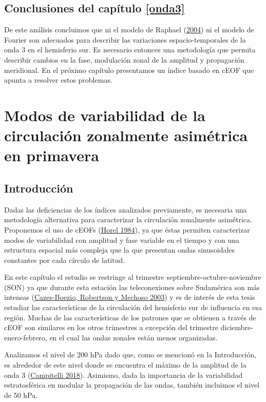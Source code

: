 \documentclass[12pt,oneside,a4paper]{reedthesis}
\begin{document}
\hypertarget{conclusiones-del-capuxedtulo-refonda3}{%
\section{Conclusiones del capítulo \ref{onda3}}\label{conclusiones-del-capuxedtulo-refonda3}}

De este análisis concluimos que ni el modelo de Raphael (\protect\hyperlink{ref-raphael2004}{2004}) ni el modelo de Fourier son adecuados para describir las variaciones espacio-temporales de la onda 3 en el hemisferio sur.
Es necesario entonces una metodología que permita describir cambios en la fase, modulación zonal de la amplitud y propagación meridional.
En el próximo capítulo presentamos un índice basado en cEOF que apunta a resolver estos problemas.

\hypertarget{ceofs}{%
\chapter{Modos de variabilidad de la circulación zonalmente asimétrica en primavera}\label{ceofs}}

\hypertarget{introducciuxf3n}{%
\section{Introducción}\label{introducciuxf3n}}

Dadas las deficiencias de los índices analizados previamente, es necesaria una metodología alternativa para caracterizar la circulación zonalmente asimétrica.
Proponemos el uso de cEOFs (\protect\hyperlink{ref-horel1984}{Horel 1984}), ya que éstas permiten caracterizar modos de variabilidad con amplitud y fase variable en el tiempo y con una estructura espacial más compleja que la que presentan ondas sinusoidales constantes por cada círculo de latitud.

En este capítulo el estudio se restringe al trimestre septiembre-octubre-noviembre (SON) ya que durante esta estación las teleconexiones sobre Sudamérica son más intensas (\protect\hyperlink{ref-cazes-boezio2003}{Cazes-Boezio, Robertson y Mechoso 2003}) y es de interés de esta tesis estudiar las características de la circulación del hemisferio sur de influencia en esa región.
Muchas de las características de los patrones que se obtienen a través de cEOF son similares en los otros trimestres a excepción del trimestre diciembre-enero-febrero, en el cual las ondas zonales están menos organizadas.

Analizamos el nivel de 200 hPa dado que, como se mencionó en la Introducción, es alrededor de este nivel donde se encuentra el máximo de la amplitud de la onda 3 (\protect\hyperlink{ref-campitelli2018b}{Campitelli 2018}).
Asimismo, dada la importancia de la variabilidad estratosférica en modular la propagación de las ondas, también incluimos el nivel de 50 hPa.
\end{document}

